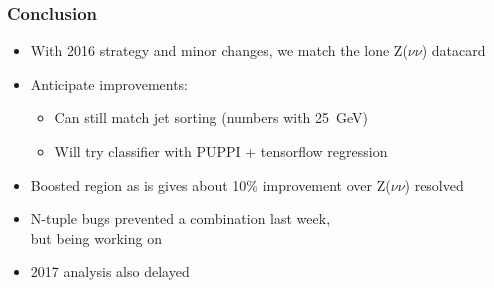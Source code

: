 \documentclass{beamer}
\newcommand{\beginbackup}{
  \newcounter{framenumbervorappendix}
  \setcounter{framenumbervorappendix}{\value{framenumber}}
}
\newcommand{\backupend}{
  \addtocounter{framenumbervorappendix}{-\value{framenumber}}
  \addtocounter{framenumber}{\value{framenumbervorappendix}}
}
\begin{document}
\begin{frame}
  \frametitle{Conclusion}
  \begin{itemize}
  \item With 2016 strategy and minor changes, we match the lone Z($\nu\nu$) datacard
  \item Anticipate improvements:
    \begin{itemize}
    \item Can still match jet sorting (numbers with \SI{25}{GeV})
    \item Will try classifier with PUPPI + tensorflow regression
    \end{itemize}
  \item Boosted region as is gives about 10\% improvement over Z($\nu\nu$) resolved
  \item N-tuple bugs prevented a combination last week, \\ but being working on
  \item 2017 analysis also delayed
  \end{itemize}
\end{frame}

%
%
%
%
\end{document}
